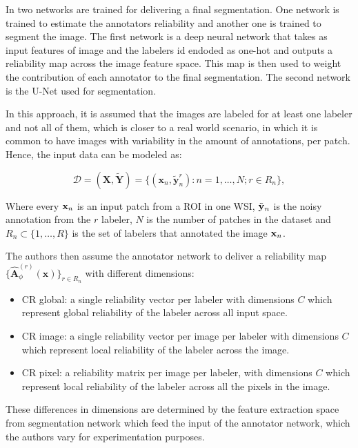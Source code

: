 In \cite{LopezEtAl2024} two networks are trained for delivering a final
segmentation. One network is trained to estimate the annotators reliability
and another one is trained to segment the image. The
first network is a deep neural network that takes as input features of
image and the labelers id endoded as one-hot and outputs a reliability
map across the image feature space. This map is then used to weight
the contribution of each annotator to the final segmentation. The
second network is the U-Net used for segmentation.

In this approach, it is assumed that the images are labeled for at least one
labeler and not all of them, which is closer to a real world scenario, in which
it is common to have images with variability in the amount of
annotations, per patch. Hence, the input data can be modeled as:

\begin{equation}
  \label{eq:input_data}
  \mathcal{D} = (\mathbf{X}, \tilde{\mathbf{Y}}) = \{ (\mathbf{x}_n,
  \tilde{\mathbf{y}}_n^r) : n = 1, \dots, N; r \in R_n \},
\end{equation}

Where every $\mathbf{x}_n$ is an input patch from a ROI in one \gls{WSI},
$\tilde{\mathbf{y}}_n$ is the noisy annotation from the $r$ labeler, $N$
is the number of patches in the dataset and $R_n \subset \{1, \dots,
R\}$ is the set of labelers that annotated the image $\mathbf{x}_n$.

The authors then assume the annotator network to deliver a
reliability map $\{\hat{\mathbf{A}}^{(r)}_{\phi}(\mathbf{x}) \}_{r
\in R_n}$ with different dimensions:

\begin{itemize}
  \item CR global: a single reliability vector per labeler with
    dimensions $C$ which represent global reliability of the labeler
    across all input space.
  \item CR image: a single reliability vector per image per labeler
    with dimensions $C$ which represent local reliability of the labeler
    across the image.
  \item CR pixel: a reliability matrix per image per labeler,
    with dimensions $C$ which represent local reliability of the labeler
    across all the pixels in the image.
\end{itemize}

These differences in dimensions are determined by the feature
extraction space from segmentation network which feed the input of the
annotator network, which the authors vary for experimentation purposes.

